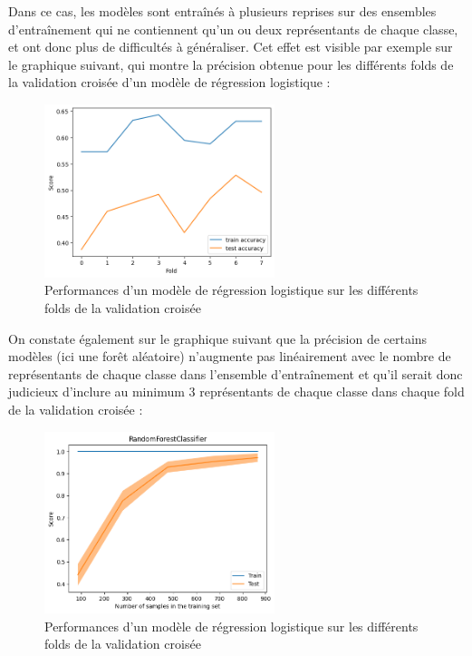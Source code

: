 \documentclass{article}
\begin{document}
Dans ce cas, les modèles sont entraînés à plusieurs reprises
sur des ensembles d'entraînement qui ne contiennent qu'un ou deux représentants de chaque classe,
et ont donc plus de difficultés à généraliser. Cet effet est visible par exemple sur le 
graphique suivant, qui montre la précision obtenue pour les différents folds de la validation
croisée d'un modèle de régression logistique :

\begin{figure}[h]
    \centering
    \includegraphics[width=0.6\textwidth]{img/folds_perfs_logreg.png}
    \caption{Performances d'un modèle de régression logistique sur les différents folds de la validation croisée}
\end{figure}
\newpage

On constate également sur le graphique suivant que la précision de certains modèles
(ici une forêt aléatoire) n'augmente
pas linéairement avec le nombre de représentants de chaque classe dans l'ensemble d'entraînement
et qu'il serait donc judicieux d'inclure au minimum 3 représentants de chaque classe dans chaque
fold de la validation croisée :

\begin{figure}[h]
    \centering
    \includegraphics[width=0.6\textwidth]{img/perf_vs_samples_rf.png}
    \caption{Performances d'un modèle de régression logistique sur les différents folds de la validation croisée}
\end{figure}
\end{document}
